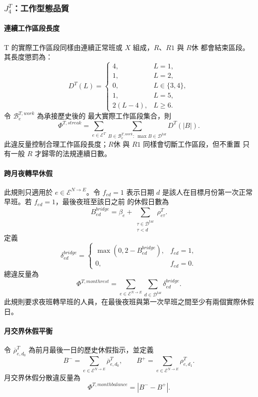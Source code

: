 \documentclass[a4paper,12pt]{article}
\begin{document}
\subsubsection{\texorpdfstring{$J^T_4$}{J4}：工作型態品質}

\paragraph{連續工作區段長度}
T 的實際工作區段同樣由連續正常班或 \(X\) 組成，\(R\)、\(R1\) 與 \(R休\)
都會結束區段。其長度懲罰為：
\[
  D^T(L)=
  \begin{cases}
    4, & L=1,\\
    1, & L=2,\\
    0, & L\in\{3,4\},\\
    1, & L=5,\\
    2(L-4), & L\geq6.
  \end{cases}
\]
令 \(\mathcal{B}^{T,work}_e\) 為承接歷史後的
最大實際工作區段集合，則
\[
  \Phi^{T,streak}
  =
  \sum_{e\in\mathcal{E}^{T}}
  \sum_{B\in\mathcal{B}^{T,work}_e:\ \max B\in\mathcal{D}^{\mathrm{tar}}}
  D^T(|B|).
\]
此違反量控制合理工作區段長度；\(R休\) 與 \(R1\) 同樣會切斷工作區段，但不重置
只有一般 \(R\) 才歸零的法規連續日數。

\paragraph{跨月夜轉早休假}
此規則只適用於 \(e\in\mathcal{E}^{N\rightarrow E}\)。令 \(f_{ed}=1\) 表示日期
\(d\) 是該人在目標月份第一次正常早班。若 \(f_{ed}=1\)，最後夜班至該日之前
的休假日數為
\[
  B^{bridge}_{ed}
  =
  \beta_e
  +
  \sum_{\substack{\tau\in\mathcal{D}^{\mathrm{tar}}\\\tau<d}}
  \rho^{T}_{e\tau}.
\]
定義
\[
  \delta^{bridge}_{ed}
  =
  \begin{cases}
    \max(0,2-B^{bridge}_{ed}), & f_{ed}=1,\\
    0, & f_{ed}=0.
  \end{cases}
\]
總違反量為
\[
  \Phi^{T,monthrest}
  =
  \sum_{e\in\mathcal{E}^{N\rightarrow E}}
  \sum_{d\in\mathcal{D}^{\mathrm{tar}}}\delta^{bridge}_{ed}.
\]
此規則要求夜班轉早班的人員，在最後夜班與第一次早班之間至少有兩個實際休假日。

\paragraph{月交界休假平衡}
令 \(\overline{\rho}^{T}_{e,d_0}\) 為前月最後一日的歷史休假指示，並定義
\[
  B^{-}
  =
  \sum_{e\in\mathcal{E}^{N\rightarrow E}}
  \overline{\rho}^{T}_{e,d_0},
  \qquad
  B^{+}
  =
  \sum_{e\in\mathcal{E}^{N\rightarrow E}}
  \rho^{T}_{e,d_1}.
\]
月交界休假分散違反量為
\[
  \Phi^{T,monthbalance}=|B^{-}-B^{+}|.
\]
\end{document}
